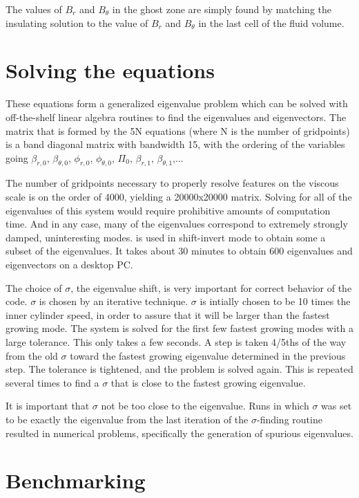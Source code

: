 \documentclass[letterpaper]{article}
\begin{document}
The values of $B_r$ and $B_\theta$ in the ghost zone are simply found
by matching the insulating solution to the value of $B_r$ and
$B_\theta$ in the last cell of the fluid volume.

\section{Solving the equations}

These equations form a generalized eigenvalue problem which can be
solved with off-the-shelf linear algebra routines to find the
eigenvalues and eigenvectors.  The matrix that is formed by the 5N
equations (where N is the number of gridpoints) is a band diagonal
matrix with bandwidth 15, with the ordering of the variables going
$\beta_{r,0}$, $\beta_{\theta,0}$, $\phi_{r,0}$, $\phi_{\theta,0}$,
$\Pi_0$, $\beta_{r,1}$, $\beta_{\theta,1}$,...

The number of gridpoints necessary to properly resolve features on the
viscous scale is on the order of 4000, yielding a 20000x20000 matrix.
Solving for all of the eigenvalues of this system would require
prohibitive amounts of computation time.  And in any case, many of the
eigenvalues correspond to extremely strongly damped, uninteresting
modes.  \verb@ARPACK@ is used in shift-invert mode to obtain some a
subset of the eigenvalues.  It takes about 30 minutes to obtain 600
eigenvalues and eigenvectors on a desktop PC.

The choice of $\sigma$, the eigenvalue shift, is very important for
correct behavior of the code.  $\sigma$ is chosen by an iterative
technique.  $\sigma$ is intially chosen to be 10 times the inner
cylinder speed, in order to assure that it will be larger than the
fastest growing mode.  The system is solved for the first few fastest
growing modes with a large tolerance.  This only takes a few seconds.
A step is taken 4/5ths of the way from the old $\sigma$ toward the
fastest growing eigenvalue determined in the previous step.  The
tolerance is tightened, and the problem is solved again.  This is
repeated several times to find a $\sigma$ that is close to the fastest
growing eigenvalue.

It is important that $\sigma$ not be too close to the eigenvalue.
Runs in which $\sigma$ was set to be exactly the eigenvalue from the
last iteration of the $\sigma$-finding routine resulted in numerical
problems, specifically the generation of spurious eigenvalues.

\section{Benchmarking}
\end{document}
